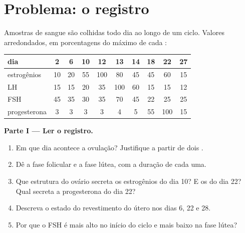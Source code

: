 \section{Problema: o registro}

\begin{problem}
\label{pb:g11:hormones-and-reproduction:1}
Amostras de sangue são colhidas todo dia ao longo de um ciclo. Valores
arredondados, em porcentagens do máximo de cada :

\begin{center}
\begin{tabular}{lccccccccc}
dia & 2 & 6 & 10 & 12 & 13 & 14 & 18 & 22 & 27 \\ \hline
estrogênios & 10 & 20 & 55 & 100 & 80 & 45 & 45 & 60 & 15 \\
LH & 15 & 15 & 20 & 35 & 100 & 60 & 15 & 15 & 12 \\
FSH & 45 & 35 & 30 & 35 & 70 & 45 & 22 & 25 & 25 \\
progesterona & 3 & 3 & 3 & 3 & 4 & 5 & 55 & 100 & 15 \\
\end{tabular}
\end{center}

\medskip
\noindent\textbf{Parte I --- Ler o registro.}
\begin{enumerate}
  \item Em que dia acontece a ovulação? Justifique a partir de dois
        .
  \item Dê a fase folicular e a fase lútea, com a duração de cada uma.
  \item Que estrutura do ovário secreta os estrogênios do dia 10? E os
        do dia 22? Qual secreta a progesterona do dia 22?
  \item Descreva o estado do revestimento do útero nos dias 6, 22 e 28.
  \item Por que o FSH é mais alto no início do ciclo e mais baixo na
        fase lútea?
\end{enumerate}


\end{problem}

